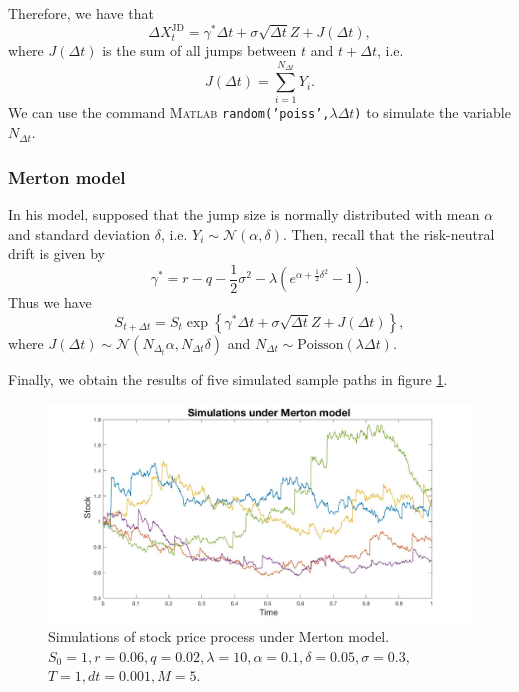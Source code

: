 Therefore, we have that
$$\Delta X_t^\text{JD} = \gamma^\ast \Delta t + \sigma \sqrt{\Delta t} Z + J(\Delta t),$$
where $J(\Delta t)$ is the sum of all jumps between $t$ and $t+\Delta t$, i.e.
$$J(\Delta t)=\sum_{i=1}^{N_{\Delta t}}Y_i.$$
We can use the command \textsc{Matlab} \texttt{random('poiss',$\lambda \Delta t$)} to simulate the variable $N_{\Delta t}$.
\subsubsection{Merton model}
In his model, \citeauthor{Mer76} supposed that the jump size is normally distributed with mean $\alpha$ and standard deviation $\delta$, i.e. $Y_i\sim\mathcal{N}(\alpha,\delta)$. Then, recall that the risk-neutral drift is given by
$$\gamma^\ast = r-q-\frac{1}{2}\sigma^2-\lambda\left(e^{\alpha+\frac{1}{2}\delta^2}-1\right).$$
Thus we have
$$S_{t+\Delta t} = S_t\exp\left\{\gamma^\ast \Delta t + \sigma \sqrt{\Delta t}Z + J(\Delta t)\right\},$$
where $J(\Delta t)\sim\mathcal{N}(N_{\Delta_t}\alpha,N_{\Delta t}\delta)$ and $N_{\Delta t}\sim\text{Poisson}(\lambda\Delta t)$.

Finally, we obtain the results of five simulated sample paths in figure \ref{fig:MC:Mer}.
\begin{figure}[!htb]
	\includegraphics[width=\textwidth]{gfx/Merton_plot}
	\caption{Simulations of stock price process under Merton model.\\ $S_0=1, r= 0.06,q = 0.02,\lambda = 10 , \alpha = 0.1, \delta = 0.05, \sigma=0.3,$\\$T = 1, dt = 0.001, M=5$.}
	\label{fig:MC:Mer}
\end{figure}

\newpage
